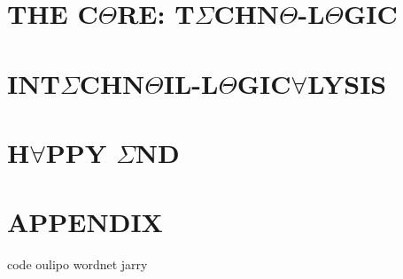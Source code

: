 \documentclass[oneside]{thesis}
\begin{document}
\part{\texorpdfstring{THE C$\Theta$RE: T$\Sigma$CHN$\Theta$-L$\Theta$GIC}{THE CORE: TECHNO-LOGIC}}

\part{\texorpdfstring{INT$\Sigma$CHN$\Theta$IL-L$\Theta$GIC$\forall$LYSIS}{INTECHNOIL-LOGICALYSIS}}

\part{\texorpdfstring{H$\forall$PPY $\Sigma$ND}{HAPPY END}}

\backmatter

\appendix

\part{APPENDIX}
{code}
{oulipo}
{wordnet}
{jarry}
\clearpage

\pagestyle{plain}
{}
\clearpage

{}
\printnoidxglossary
\clearpage
\end{document}
